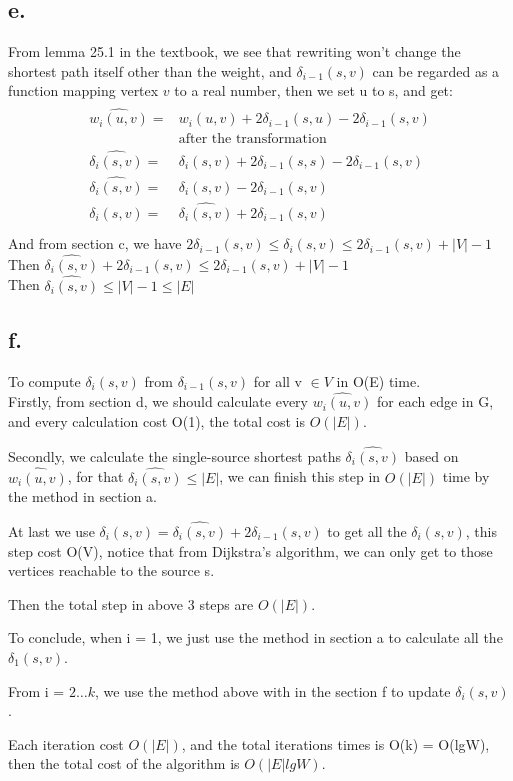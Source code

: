 \documentclass[oneside]{homework} %
\begin{document}
\subsection*{e.}
From lemma 25.1 in the textbook, we see that rewriting won't change the shortest path itself other than the weight, and $\delta_{i-1}(s,v)$ can be regarded as a function mapping vertex $v$ to a real number, then we set u to s, and get:
\begin{eqnarray*}
  \begin{split}
	\hat{w_{i}(u,v)} =& w_{i}(u,v) + 2\delta_{i-1}(s,u) - 2\delta_{i-1}(s,v) \\
	&\text{after the transformation} \\
	\hat{\delta_{i}(s,v)} =& \delta_{i}(s,v) + 2\delta_{i-1}(s,s) - 2\delta_{i-1}(s,v) \\
	\hat{\delta_{i}(s,v)} =& \delta_{i}(s,v)  - 2\delta_{i-1}(s,v) \\
	\delta_{i}(s,v) =& \hat{\delta_{i}(s,v)}  + 2\delta_{i-1}(s,v) \\
  \end{split}
  \label{equ:e1}
\end{eqnarray*}
And from section c, we have $2\delta_{i-1}(s,v) \leq \delta_{i}(s,v) \leq 2\delta_{i-1}(s,v)+|V|-1$ \\
Then $\hat{\delta_{i}(s,v)}  + 2\delta_{i-1}(s,v) \leq 2\delta_{i-1}(s,v)+|V|-1$ \\
Then $\hat{\delta_{i}(s,v)} \leq |V|-1 \leq |E|$



\subsection*{f.}
To compute $\delta_{i}(s,v)$ from $\delta_{i-1}(s,v)$ for all v $\in V$ in O(E) time. \\

Firstly, from section d, we should calculate every $\hat{w_{i}(u,v)}$ for each edge in G, and every calculation cost O(1), the total cost is $O(|E|)$. 

Secondly, we calculate the single-source shortest paths $\hat{\delta_{i}(s,v)}$ based on $\hat{w_{i}(u,v)}$, for that $\hat{\delta_{i}(s,v)} \leq |E|$, we can finish this step in $O(|E|)$ time by the method in section a.

At last we use $\delta_{i}(s,v) = \hat{\delta_{i}(s,v)}  + 2\delta_{i-1}(s,v)$ to get all the $\delta_{i}(s,v)$, this step cost O(V), notice that from Dijkstra's algorithm, we can only get to those vertices reachable to the source s.

Then the total step in above 3 steps are $O(|E|)$.

To conclude, when i = 1, we just use the method in section a to calculate all the $\delta_{1}(s,v)$.

From i = $2\ldots k $, we use the method above with in the section f to update $\delta_{i}(s,v)$.

Each iteration cost $O(|E|)$, and the total iterations times is O(k) = O(lgW), then the total cost of the algorithm is $O(|E|lgW)$.
\end{document}
